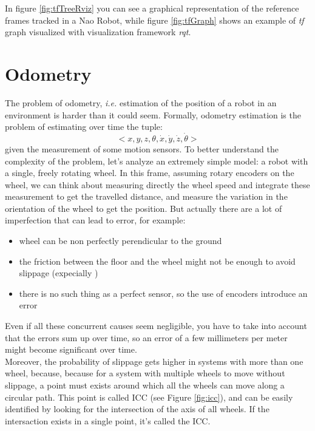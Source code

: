 In figure \ref{fig:tfTreeRviz} you can see a graphical representation of the reference frames tracked in a Nao Robot, while figure \ref{fig:tfGraph} shows an example of \textit{tf} graph visualized with visualization framework \textit{rqt}. 


\section{Odometry}\label{sec:odometry}

The problem of odometry, \textit{i.e.} estimation of the position of a robot in an environment is harder than it could seem. Formally, odometry estimation is the problem of estimating over time the tuple: 
\begin{equation}
	<x, y, z, \theta,\dot{x}, \dot{y}, \dot{z}, \dot{\theta}>
	\label{eq:odometryTuple}
\end{equation} 
given the measurement of some motion sensors. 
To better understand the complexity of the problem, let's analyze an extremely simple model: a robot with a single, freely rotating wheel. In this frame, assuming rotary encoders on the wheel, we can think about measuring directly the wheel speed and integrate these measurement to get the travelled distance, and measure the variation in the orientation of the wheel to get the position. But actually there are a lot of imperfection that can lead to error, for example:
	\begin{itemize}
		\item wheel can be non perfectly perendicular to the ground
		\item the friction between the floor and the wheel might not be enough to avoid slippage (expecially )
		\item there is no such thing as a perfect sensor, so the use of encoders introduce an error
	\end{itemize}
Even if all these concurrent causes seem negligible, you have to take into account that the errors sum up over time, so an error of a few millimeters per meter might become significant over time. \\ 
Moreover, the probability of slippage gets higher in systems with more than one wheel, because, because for a system with multiple wheels to move without slippage, a point must exists around which all the wheels can move along a circular path. This point is called \ac{ICC} (see Figure \ref{fig:icc}), and can be easily identified by looking for the intersection of the axis of all wheels. If the intersaction exists in a single point, it's called the \ac{ICC}.
